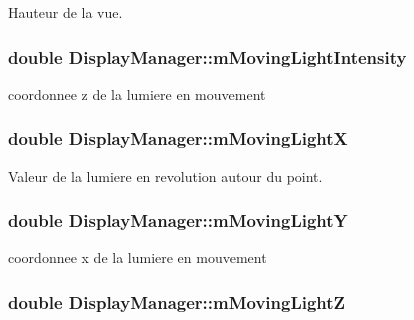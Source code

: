 Hauteur de la vue. 

\hypertarget{class_display_manager_a610bc38fd015510a3d0f51c0c7ffe17f}{
\subsubsection[{m\+Moving\+Light\+Intensity}]{\setlength{\rightskip}{0pt plus 5cm}double Display\+Manager\+::m\+Moving\+Light\+Intensity}}\label{class_display_manager_a610bc38fd015510a3d0f51c0c7ffe17f}


coordonnee z de la lumiere en mouvement 

\hypertarget{class_display_manager_aa46bc5dad868a607c958d1ca692c59bc}{
\subsubsection[{m\+Moving\+Light\+X}]{\setlength{\rightskip}{0pt plus 5cm}double Display\+Manager\+::m\+Moving\+Light\+X}}\label{class_display_manager_aa46bc5dad868a607c958d1ca692c59bc}


Valeur de la lumiere en revolution autour du point. 

\hypertarget{class_display_manager_aa30e52908e554a66068599d65a978c9f}{
\subsubsection[{m\+Moving\+Light\+Y}]{\setlength{\rightskip}{0pt plus 5cm}double Display\+Manager\+::m\+Moving\+Light\+Y}}\label{class_display_manager_aa30e52908e554a66068599d65a978c9f}


coordonnee x de la lumiere en mouvement 

\hypertarget{class_display_manager_a87393e7c9a62c2f978b04c5e6adf2666}{
\subsubsection[{m\+Moving\+Light\+Z}]{\setlength{\rightskip}{0pt plus 5cm}double Display\+Manager\+::m\+Moving\+Light\+Z}}\label{class_display_manager_a87393e7c9a62c2f978b04c5e6adf2666}


